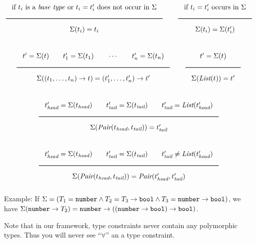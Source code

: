 \[
  \Rule{\textrm{if $t_i$ is a \emph{base type} or }t_i = t_i'\textrm{ does not occur in }\Sigma}{
    \Sigma(t_i) = t_i}
  \qquad
  \Rule{\textrm{if }t_i = t_i'\textrm{ occurs in }\Sigma}{
    \Sigma(t_i) = \Sigma(t_i')}  
\]

\[
  \Rule{t' = \Sigma(t) \qquad t_1' = \Sigma(t_1) \qquad \cdots \qquad t_n' = \Sigma(t_n) }{
  \Sigma((t_1, \ldots, t_n) \rightarrow t) = (t_1', \ldots, t_n') \rightarrow t'}
  \qquad
  \Rule{t' = \Sigma(t)}{
  \Sigma(\List(t)) = t'}
\]

\[
  \Rule{t_\head' = \Sigma(t_\head) \qquad t_\tail' = \Sigma(t_\tail) \qquad t_\tail' = \List(t_\head') }{
  \Sigma(\Pair(t_\head, t_\tail)) = t_\tail'}
\]

\[
  \Rule{t_\head' = \Sigma(t_\head) \qquad t_\tail' = \Sigma(t_\tail) \qquad t_\tail' \neq \List(t_\head') }{
  \Sigma(\Pair(t_\head, t_\tail)) = \Pair(t_\head', t_\tail')}
\]

\noindent
Example: If $\Sigma = (T_1 = \texttt{number} \wedge T_2 = T_3 \rightarrow \texttt{bool} \wedge T_3 = \texttt{number}
\rightarrow \texttt{bool})$, we have $\Sigma(\texttt{number} \rightarrow T_2) = \texttt{number} \rightarrow ((\texttt{number}
\rightarrow \texttt{bool}) \rightarrow \texttt{bool})$.

Note that in our framework, type constraints never contain any polymorphic types. Thus
you will never see ``$\forall$'' an a type constraint.

